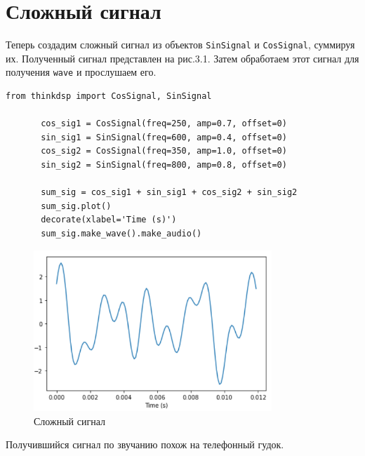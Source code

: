 \documentclass[a4paper,12pt]{report}
\begin{document}
\section{Сложный сигнал}
    Теперь создадим сложный сигнал из объектов \texttt{SinSignal} и
\texttt{CosSignal}, суммируя их. Полученный сигнал представлен на рис.3.1. Затем обработаем этот сигнал для получения \texttt{wave} и прослушаем его.
\begin{lstlisting}[caption=Создание сложного сигнала]
       from thinkdsp import CosSignal, SinSignal

       cos_sig1 = CosSignal(freq=250, amp=0.7, offset=0)
       sin_sig1 = SinSignal(freq=600, amp=0.4, offset=0)
       cos_sig2 = CosSignal(freq=350, amp=1.0, offset=0)
       sin_sig2 = SinSignal(freq=800, amp=0.8, offset=0)

       sum_sig = cos_sig1 + sin_sig1 + cos_sig2 + sin_sig2
       sum_sig.plot()
       decorate(xlabel='Time (s)')
       sum_sig.make_wave().make_audio()
\end{lstlisting}
\begin{figure}[H]
        \centering
        \includegraphics[width=0.8\textwidth]{fig3-1.PNG}
        \caption{Сложный сигнал}
        \label{fig:fig3-1}
\end{figure}

    Получившийся сигнал по звучанию похож на телефонный гудок.
    
\end{document}
